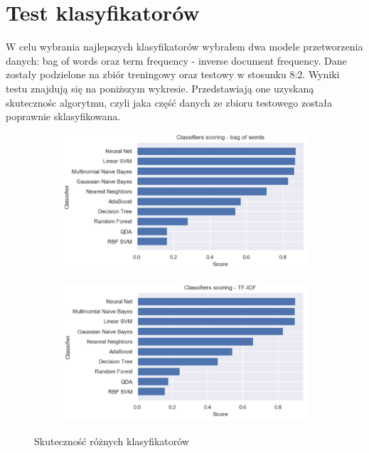 \newpage
\section{Test klasyfikatorów}

W celu wybrania najlepszych klasyfikatorów wybrałem dwa modele przetworzenia danych: bag of words oraz term frequency - inverse document frequency. Dane zostały podzielone na zbiór treningowy oraz testowy w stosunku 8:2. Wyniki testu znajdują się na poniższym wykresie. Przedstawiają one uzyskaną skutecznośc algorytmu, czyli jaka część danych ze zbioru testowego została poprawnie sklasyfikowana.

\begin{figure}[H]
     \centering
     \begin{subfigure}[b]{0.8\textwidth}
         \centering
         \includegraphics[width=\textwidth]{images/analiza/classifiers_bag.png}
     \end{subfigure}
     \hfill
     \begin{subfigure}[b]{0.8\textwidth}
         \centering
         \includegraphics[width=\textwidth]{images/analiza/classifiers_tfidf.png}
     \end{subfigure}
        \caption{Skuteczność różnych klasyfikatorów}
        \label{fig:classifiers_test}
\end{figure}

